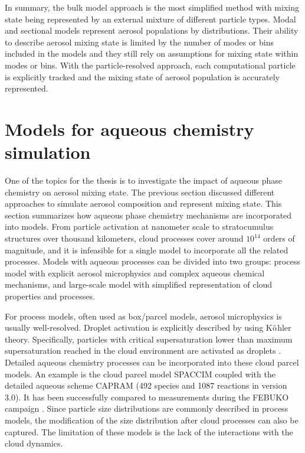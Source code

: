 \documentclass[edeposit,fullpage]{uiucthesis2009}
\newcommand{\jcedits}[1]{{\color{blue} #1}}
\begin{document}
In summary, the bulk model approach is the most simplified method with
mixing state being represented by an external mixture of different
particle types. Modal and sectional models represent aerosol
populations by distributions. Their ability to describe aerosol mixing
state is limited by the number of modes or bins included in the models
and they still rely on assumptions for mixing state within modes or
bins. With the particle-resolved approach, each computational particle
is explicitly tracked and the mixing state of aerosol population is
accurately represented.

\section{Models for aqueous chemistry simulation }
One of the topics for the thesis is to investigate the impact \jcedits{of}
aqueous phase chemistry on aerosol mixing state. The previous section
discussed different approaches to simulate aerosol composition and
represent mixing state. This section summarizes how aqueous phase
chemistry mechanisms are incorporated into models. From particle
activation at nanometer scale to stratocumulus structures over
thousand kilometers, cloud processes cover around $10^{14}$ orders of
magnitude, and it is infeasible for a single model to incorporate all
the related processes. Models with aqueous processes can be divided
into two groups: process model with explicit aerosol microphysics and
complex aqueous chemical mechanisms, and
large-scale model with simplified representation of cloud properties
and processes.

For process models, often used as box/parcel models, aerosol
microphysics is usually well-resolved. Droplet activation is
explicitly described by using K$\rm \ddot{o}$hler
theory. Specifically, particles with critical supersaturation lower
than maximum supersaturation reached in the \jcedits{cloud} environment are activated
as droplets \citep{rothenberg2016metamodeling,
  ching2012impacts}. Detailed aqueous chemistry processes can be
incorporated into these cloud parcel models. An example is the cloud
parcel model SPACCIM coupled with the detailed aqueous scheme CAPRAM
(492 species and 1087 reactions in version 3.0). It has been
successfully compared to measurements during the FEBUKO campaign
\citep{wolke2005spaccim}. Since particle size distributions are
commonly described in process models, the modification of the size
distribution after cloud processes can also be captured. The
limitation of these models is the lack of the interactions with the
cloud dynamics. 
\end{document}
